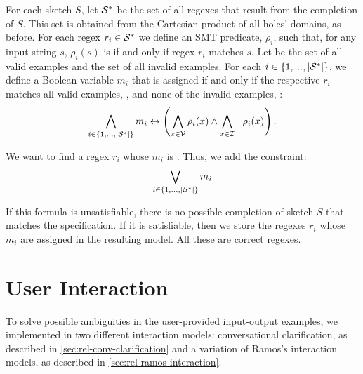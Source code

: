 For each sketch \(S\), let \({\mathcal{S}}^*\) be the set of all regexes that result from the completion of \(S\). This set is obtained from the Cartesian product of all holes' domains, as before. For each regex \(r_i \in {\ensuremath{\mathcal{S}}}^*\) we define an SMT predicate, \(\rho_i\), such that, for any input string \(s\), \(\rho_i(s)\) is \true if and only if regex \(r_i\) matches \(s\). Let  be the set of all valid examples and  the set of all invalid examples. For each \(i \in \{1, ..., |{\mathcal{S}}^*|\}\), we define a Boolean variable \(m_i\) that is assigned \true if and only if the respective \(r_i\) matches all valid examples, , and none of the invalid examples, :
\begin{equation}
    \bigwedge_{i \in \{1, ..., |{\mathcal{S}}^*|\}} m_i \leftrightarrow
    \left( \bigwedge_{x \in {\ensuremath{\mathcal{V}}}} \rho_i(x) \land \bigwedge_{x \in {\ensuremath{\mathcal{I}}}} \neg \rho_i(x) \right).
\end{equation}

\noindent
We want to find a regex \(r_i\) whose \(m_i\) is \true. Thus, we add the constraint:
\begin{equation}
    \bigvee_{i \in \{1, ..., |{\mathcal{S}}^*|\}} m_i
\end{equation}

If this formula is unsatisfiable, there is no possible completion of sketch \(S\) that matches the specification. If it is satisfiable, then we store the regexes \(r_i\) whose \(m_i\) are assigned \true in the resulting model. All these are correct regexes.


\section{User Interaction} \label{sec:regex-interaction}

To solve possible ambiguities in the user-provided input-output examples, we implemented in \Forest{} two different interaction models: conversational clarification, as described in \autoref{sec:rel-conv-clarification} and a variation of Ramos's interaction models, as described in \autoref{sec:rel-ramos-interaction}.

